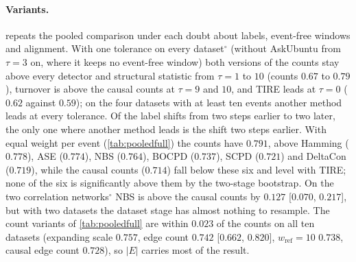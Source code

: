 \documentclass[11pt]{article}
\theoremstyle{dsplain}
\theoremstyle{definition}
\begin{document}
\paragraph{Variants.}  repeats the pooled comparison under each doubt about labels,
event-free windows and alignment. With one tolerance on every dataset$^\circ$ (without AskUbuntu from $\tau = 3$ on, where it keeps no event-free window) both versions of the counts
stay above every detector and structural statistic from $\tau = 1$ to $10$ (counts $0.67$ to $0.79$),
turnover is above the causal counts at $\tau = 9$ and $10$, and TIRE leads at $\tau = 0$ ($0.62$ against
$0.59$); on the four datasets with at least ten events another method leads at every tolerance. Of the label
shifts from two steps earlier to two later, the only one where another method leads is the shift two steps
earlier. With equal weight per event (\cref{tab:pooledfull}) the counts have $0.791$, above Hamming
($0.778$), ASE ($0.774$), NBS ($0.764$), BOCPD ($0.737$), SCPD ($0.721$) and DeltaCon ($0.719$), while the
causal counts ($0.714$) fall below these six and level with TIRE; none of the six is significantly above
them by the two-stage bootstrap. On the two correlation networks$^\circ$ NBS is above the causal counts by
$0.127$ [$0.070$, $0.217$], but with two datasets the dataset stage has almost nothing to resample. The
count variants of \cref{tab:pooledfull} are within $0.023$ of the counts on all ten datasets (expanding
scale $0.757$, edge count $0.742$ [$0.662$, $0.820$], $w_{\mathrm{ref}} = 10$ $0.738$, causal edge count
$0.728$), so $|E|$ carries most of the result.
\end{document}

